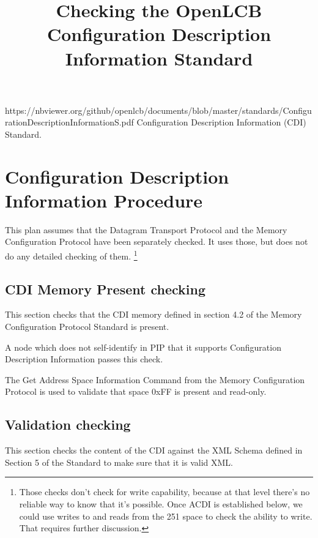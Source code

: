 

\title{Checking the OpenLCB Configuration Description Information Standard}


\maketitle


\introductionCaveats
    {https://nbviewer.org/github/openlcb/documents/blob/master/standards/ConfigurationDescriptionInformationS.pdf}
    {Configuration Description Information (CDI) Standard}.

\section{Configuration Description Information Procedure}


This plan assumes that the Datagram Transport Protocol and the Memory Configuration Protocol 
have been separately checked. It uses those, but does not do any detailed checking of them.
\footnote{Those checks don't check for write capability, because at that level
    there's no reliable way to know that it's possible. 
    Once ACDI is established below, we could use writes to and reads from the
    251 space to check the ability to write.
    That requires further discussion.
}

\subsection{CDI Memory Present checking}

This section checks that the CDI memory defined in section 4.2 of the Memory
Configuration Protocol Standard is present.

A node which does not self-identify in PIP that it supports
Configuration Description Information passes this check.

The Get Address Space Information Command from the Memory Configuration Protocol
is used to validate that space 0xFF is present and read-only.

\subsection{Validation checking}

This section checks the content of the CDI against the XML Schema 
defined in Section 5 of the Standard to make sure that it is valid XML. 


